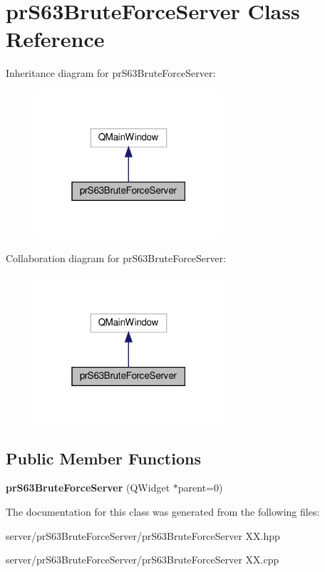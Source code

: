 \hypertarget{classpr_s63_brute_force_server}{}\section{pr\+S63\+Brute\+Force\+Server Class Reference}
\label{classpr_s63_brute_force_server}


Inheritance diagram for pr\+S63\+Brute\+Force\+Server\+:\nopagebreak
\begin{figure}[H]
\begin{center}
\leavevmode
\includegraphics[width=199pt]{classpr_s63_brute_force_server__inherit__graph}
\end{center}
\end{figure}


Collaboration diagram for pr\+S63\+Brute\+Force\+Server\+:\nopagebreak
\begin{figure}[H]
\begin{center}
\leavevmode
\includegraphics[width=199pt]{classpr_s63_brute_force_server__coll__graph}
\end{center}
\end{figure}
\subsection*{Public Member Functions}
\begin{DoxyCompactItemize}
\item 
\mbox{\label{classpr_s63_brute_force_server_a9a2fb54eccec9ea1687a2c8938e1cd28}} 
{\bfseries pr\+S63\+Brute\+Force\+Server} (Q\+Widget $\ast$parent=0)
\end{DoxyCompactItemize}


The documentation for this class was generated from the following files\+:\begin{DoxyCompactItemize}
\item 
server/pr\+S63\+Brute\+Force\+Server/pr\+S63\+Brute\+Force\+Server X\+X.\+hpp\item 
server/pr\+S63\+Brute\+Force\+Server/pr\+S63\+Brute\+Force\+Server X\+X.\+cpp\end{DoxyCompactItemize}
